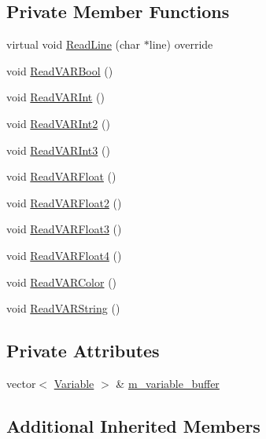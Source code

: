 \subsection*{Private Member Functions}
\begin{DoxyCompactItemize}
\item 
virtual void \hyperlink{classmage_1_1_v_a_r_reader_ae6c88d1a081c8e127f1e1258a3c2660d}{Read\+Line} (char $\ast$line) override
\item 
void \hyperlink{classmage_1_1_v_a_r_reader_a06368ab2f488f2d88008c73beb35acc2}{Read\+V\+A\+R\+Bool} ()
\item 
void \hyperlink{classmage_1_1_v_a_r_reader_a9b78c642785ef8a9c487ba9cc84842c4}{Read\+V\+A\+R\+Int} ()
\item 
void \hyperlink{classmage_1_1_v_a_r_reader_a33bc794769330f6d4593dfbfceaa0c95}{Read\+V\+A\+R\+Int2} ()
\item 
void \hyperlink{classmage_1_1_v_a_r_reader_a8a809be1eeebc2649e16524d8c65529f}{Read\+V\+A\+R\+Int3} ()
\item 
void \hyperlink{classmage_1_1_v_a_r_reader_a2d36a7cf1547cd795ee451c0219dd9f3}{Read\+V\+A\+R\+Float} ()
\item 
void \hyperlink{classmage_1_1_v_a_r_reader_a03a2cfead8f57843bb4a2c9bc8d00b67}{Read\+V\+A\+R\+Float2} ()
\item 
void \hyperlink{classmage_1_1_v_a_r_reader_a96e2af0f4462192867da2beead30ca67}{Read\+V\+A\+R\+Float3} ()
\item 
void \hyperlink{classmage_1_1_v_a_r_reader_a6f14f9f9696e32090f262682c519bc10}{Read\+V\+A\+R\+Float4} ()
\item 
void \hyperlink{classmage_1_1_v_a_r_reader_a7c36b7e10fa9daf7366ec4e84c11ca2a}{Read\+V\+A\+R\+Color} ()
\item 
void \hyperlink{classmage_1_1_v_a_r_reader_a52bb3a842c7887099a4dff875a3608a0}{Read\+V\+A\+R\+String} ()
\end{DoxyCompactItemize}
\subsection*{Private Attributes}
\begin{DoxyCompactItemize}
\item 
vector$<$ \hyperlink{structmage_1_1_variable}{Variable} $>$ \& \hyperlink{classmage_1_1_v_a_r_reader_ad532fcdb98d95524c4e62564058485d3}{m\+\_\+variable\+\_\+buffer}
\end{DoxyCompactItemize}
\subsection*{Additional Inherited Members}


